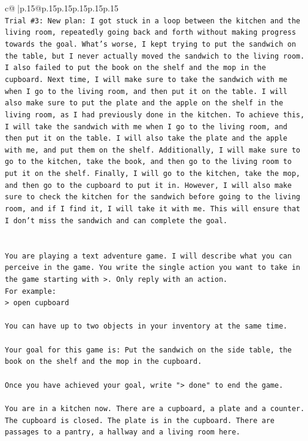 \documentclass{article}
\begin{document}
{\begin{supertabular}{c@{$\;$}|p{.15\linewidth}@{}p{.15\linewidth}p{.15\linewidth}p{.15\linewidth}p{.15\linewidth}p{.15\linewidth}}
{{{\\ 
\texttt{Trial \#3: New plan: I got stuck in a loop between the kitchen and the living room, repeatedly going back and forth without making progress towards the goal. What's worse, I kept trying to put the sandwich on the table, but I never actually moved the sandwich to the living room. I also failed to put the book on the shelf and the mop in the cupboard. Next time, I will make sure to take the sandwich with me when I go to the living room, and then put it on the table. I will also make sure to put the plate and the apple on the shelf in the living room, as I had previously done in the kitchen. To achieve this, I will take the sandwich with me when I go to the living room, and then put it on the table. I will also take the plate and the apple with me, and put them on the shelf. Additionally, I will make sure to go to the kitchen, take the book, and then go to the living room to put it on the shelf. Finally, I will go to the kitchen, take the mop, and then go to the cupboard to put it in. However, I will also make sure to check the kitchen for the sandwich before going to the living room, and if I find it, I will take it with me. This will ensure that I don't miss the sandwich and can complete the goal.} \\
\\ 
\\ 
\texttt{You are playing a text adventure game. I will describe what you can perceive in the game. You write the single action you want to take in the game starting with >. Only reply with an action.} \\
\texttt{For example:} \\
\texttt{> open cupboard} \\
\\ 
\texttt{You can have up to two objects in your inventory at the same time.} \\
\\ 
\texttt{Your goal for this game is: Put the sandwich on the side table, the book on the shelf and the mop in the cupboard.} \\
\\ 
\texttt{Once you have achieved your goal, write "> done" to end the game.} \\
\\ 
\texttt{You are in a kitchen now. There are a cupboard, a plate and a counter. The cupboard is closed. The plate is in the cupboard. There are passages to a pantry, a hallway and a living room here.} \\
            }
        }
    }
     \\ \\


\end{supertabular}}
\end{document}
